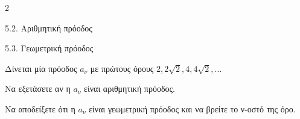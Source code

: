 \begin{ylh}{2}
    \item 5.2. Αριθμητική πρόοδος
    \item 5.3. Γεωμετρική πρόοδος
\end{ylh}
Δίνεται μία πρόοδος $a_{\nu}$ με πρώτους όρους $2,2\sqrt{2},4,4\sqrt{2},...$
\begin{alist}
\item Να εξετάσετε αν η $a_{\nu}$ είναι αριθμητική πρόοδος.
\item Να αποδείξετε ότι η $a_{\nu}$ είναι γεωμετρική πρόοδος και να βρείτε το ν-οστό της όρο.
\end{alist}

